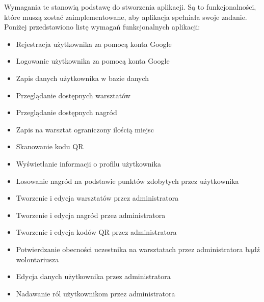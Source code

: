 Wymagania te stanowią podstawę do stworzenia aplikacji. Są to funkcjonalności, które muszą zostać zaimplementowane, aby aplikacja spełniała swoje zadanie. Poniżej przedstawiono listę wymagań funkcjonalnych aplikacji:
\begin{itemize}
    \item Rejestracja użytkownika za pomocą konta Google
    \item Logowanie użytkownika za pomocą konta Google
    \item Zapis danych użytkownika w bazie danych
    \item Przeglądanie dostępnych warsztatów
    \item Przeglądanie dostępnych nagród
    \item Zapis na warsztat ograniczony ilością miejsc
    \item Skanowanie kodu QR
    \item Wyświetlanie informacji o profilu użytkownika
    \item Losowanie nagród na podstawie punktów zdobytych przez użytkownika
    \item Tworzenie i edycja warsztatów przez administratora    
    \item Tworzenie i edycja nagród przez administratora
    \item Tworzenie i edycja kodów QR przez administratora
    \item Potwierdzanie obecności uczestnika na warsztatach przez administratora bądź wolontariusza
    \item Edycja danych użytkownika przez administratora
    \item Nadawanie ról użytkownikom przez administratora
\end{itemize}